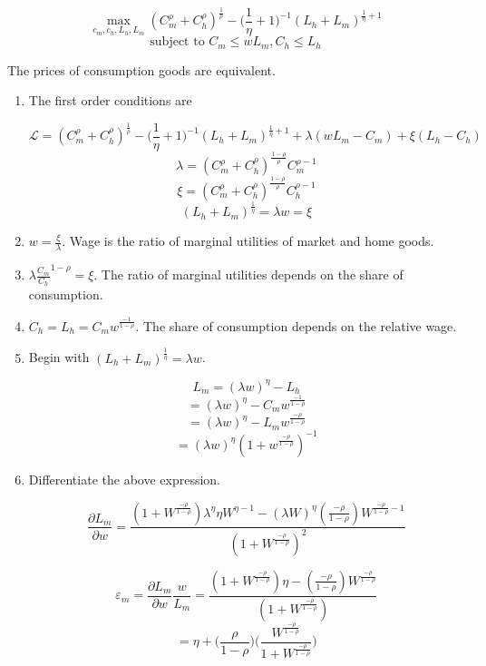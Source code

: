 \documentclass[11pt]{article}
\begin{document}
        $$ \max_{c_m, c_h, L_h, L_m} (C_m^\rho + C_h^\rho)^\frac{1}{\rho} - \bigg ( \frac{1}{\eta}+1 \bigg )^{-1} (L_h + L_m)^{\frac{1}{\eta}+1} $$
        $$ \text{subject to~} C_m \leq w L_m, C_h \leq L_h $$

    The prices of consumption goods are equivalent.

    \begin{enumerate}

        \item The first order conditions are

            $$ \mathcal L = (C_m^\rho + C_h^\rho)^\frac{1}{\rho} - \bigg ( \frac{1}{\eta}+1 \bigg )^{-1} (L_h + L_m)^{\frac{1}{\eta}+1} + \lambda (w L_m - C_m) + \xi (L_h - C_h) $$
            $$ \lambda = (C_m^\rho + C_h^\rho)^\frac{1-\rho}{\rho} C_m^{\rho-1} $$
            $$ \xi = (C_m^\rho + C_h^\rho)^\frac{1-\rho}{\rho} C_h^{\rho-1} $$
            $$ (L_h + L_m)^\frac{1}{\eta} = \lambda w = \xi $$

        \item $w = \frac{\xi}{\lambda}$. Wage is the ratio of marginal utilities of market and home goods.

        \item $\lambda \frac{C_m}{C_h}^{1-\rho} = \xi$. The ratio of marginal utilities depends on the share of consumption.

        \item $C_h = L_h = C_m w^\frac{-1}{1-\rho}$. The share of consumption depends on the relative wage.

        \item Begin with $(L_h + L_m)^\frac{1}{\eta} = \lambda w$.

            $$ L_m = (\lambda w)^\eta - L_h $$
            $$ = (\lambda w)^\eta - C_m w^\frac{-1}{1-\rho} $$
            $$ = (\lambda w)^\eta - L_m w^\frac{-\rho}{1-\rho} $$
            $$ = (\lambda w)^\eta (1 + w^\frac{-\rho}{1-\rho})^{-1}  $$

        \item Differentiate the above expression.

            $$ \frac{\partial L_m}{\partial w} = \frac{(1 + W^{\frac{-\rho}{1-\rho}}) \lambda^{\eta} \eta W^{\eta - 1} - (\lambda W)^{\eta} (\frac{-\rho}{1-\rho}) W^{\frac{-\rho}{1-\rho} - 1}}{(1 + W^{\frac{-\rho}{1-\rho}})^2} $$

            $$ \varepsilon_m = \frac{\partial L_m}{\partial w} \frac{w}{L_m} = \frac{(1 + W^{\frac{-\rho}{1-\rho}}) \eta  -  (\frac{-\rho}{1-\rho}) W^{\frac{-\rho}{1-\rho}}}{(1 + W^{\frac{-\rho}{1-\rho}})} $$
        	$$ = \eta + \bigg ( \frac{\rho}{1-\rho} \bigg ) \bigg ( \frac{W^{\frac{-\rho}{1-\rho}}}{1 + W^{\frac{-\rho}{1-\rho}}} \bigg ) $$


\end{enumerate}
\end{document}
